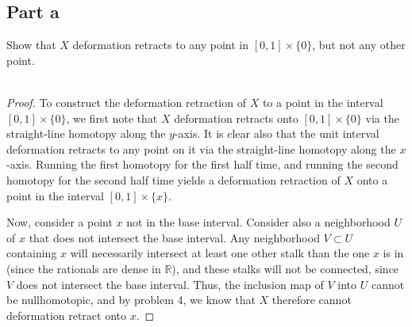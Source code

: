 \documentclass[fontsize=11pt]{scrartcl} %
\numberwithin{equation}{section} %
\numberwithin{figure}{section} %
\numberwithin{table}{section} %
\newcommand{\R}{\mathbb{R}}
\begin{document}
\subsection*{Part a}
Show that $X$ deformation retracts to any point in $[0,1]\times\{0\}$, but not
any other point.
\\
\\
\begin{proof}
    To construct the deformation retraction of $X$ to a point in the interval
    $[0,1]\times\{0\}$, we first note that $X$ deformation retracts onto
    $[0,1]\times\{0\}$ via the straight-line homotopy along the $y$-axis. It is
    clear also that the unit interval deformation retracts to any point on it
    via the straight-line homotopy along the $x$-axis. Running the first
    homotopy for the first half time, and running the second homotopy for the
    second half time yields a deformation retraction of $X$ onto a point in the
    interval $[0,1]\times\{x\}$.

    Now, consider a point $x$ not in the base interval. Consider also a
    neighborhood $U$ of $x$ that does not intersect the base interval. Any
    neighborhood $V\subset U$ containing $x$ will necessarily intersect at least
    one other stalk than the one $x$ is in (since the rationals are dense in
    $\R$), and these stalks will not be connected, since $V$ does not intersect
    the base interval. Thus, the inclusion map of $V$ into $U$ cannot be
    nullhomotopic, and by problem 4, we know that $X$ therefore cannot
    deformation retract onto $x$.
\end{proof}
\end{document}
